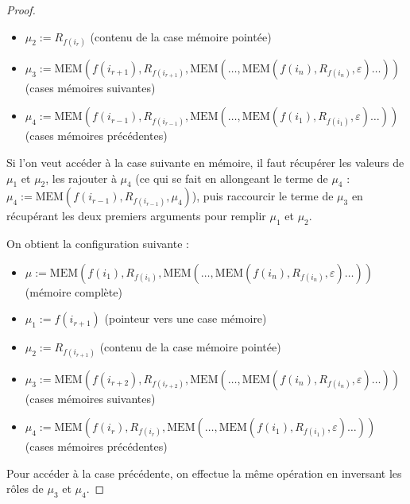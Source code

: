 \documentclass{report}
\begin{document}
\begin{proof}
\begin{itemize}
						\item 	
								$\mu_2 := R_{f(i_r)}$ (contenu de la case mémoire pointée)
								
						\item 	
								$\mu_3 := \text{MEM}(f(i_{r+1}), R_{f(i_{r+1})}, \text{MEM}( \dots, \text{MEM}(f(i_n), R_{f(i_n)}, \varepsilon) \dots ) )$ (cases mémoires suivantes)
								
						\item 	
								$\mu_4 := \text{MEM}(f(i_{r-1}), R_{f(i_{r-1})}, \text{MEM}( \dots, \text{MEM}(f(i_1), R_{f(i_1)}, \varepsilon) \dots ) )$ (cases mémoires précédentes)
					\end{itemize}
					
					Si l'on veut accéder à la case suivante en mémoire, il faut récupérer les valeurs de $\mu_1$ et $\mu_2$, les rajouter à $\mu_4$ (ce qui se fait en allongeant le terme de $\mu_4$ : $\mu_4 := \text{MEM}(f(i_{r-1}), R_{f(i_{r-1})}, \mu_4)$), puis raccourcir le terme de $\mu_3$ en récupérant les deux premiers arguments pour remplir $\mu_1$ et $\mu_2$.
					
					On obtient la configuration suivante : 
					
					
					\begin{itemize}
						\item 	
								$\mu := \text{MEM}(f(i_1), R_{f(i_1)}, \text{MEM}( \dots, \text{MEM}(f(i_n), R_{f(i_n)}, \varepsilon) \dots ) )$ (mémoire complète)
						
						\item 	
								$\mu_1 := f(i_{r+1})$ (pointeur vers une case mémoire)
						
						\item 	
								$\mu_2 := R_{f(i_{r+1})}$ (contenu de la case mémoire pointée)
						
						\item 	
								$\mu_3 := \text{MEM}(f(i_{r+2}), R_{f(i_{r+2})}, \text{MEM}( \dots, \text{MEM}(f(i_n), R_{f(i_n)}, \varepsilon) \dots ) )$ (cases mémoires suivantes)
						
						\item 	
								$\mu_4 := \text{MEM}(f(i_{r}), R_{f(i_{r})}, \text{MEM}( \dots, \text{MEM}(f(i_1), R_{f(i_1)}, \varepsilon) \dots ) )$ (cases mémoires précédentes)
					\end{itemize}					
					
					
					Pour accéder à la case précédente, on effectue la même opération en inversant les rôles de $\mu_3$ et $\mu_4$.
					

\end{proof}
\end{document}
